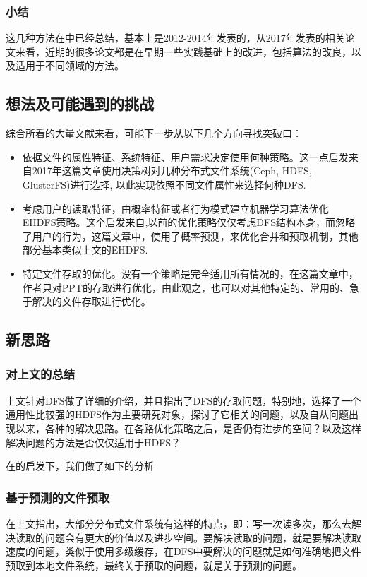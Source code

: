 \documentclass[UTF8]{ctexart}
\begin{document}
\subsubsection{小结}
这几种方法在\cite{Sachin}中已经总结，基本上是2012-2014年发表的，从2017年发表的相关论文来看，近期的很多论文都是在早期一些实践基础上的改进，包括算法的改良，以及适用于不同领域的方法。

\subsection{想法及可能遇到的挑战}
综合所看的大量文献来看，可能下一步从以下几个方向寻找突破口：

\begin{itemize}
\item 依据文件的属性特征、系统特征、用户需求决定使用何种策略。这一点启发来自2017年这篇文章\cite{Lidong}使用决策树对几种分布式文件系统(Ceph, HDFS, GlusterFS)进行选择, 以此实现依照不同文件属性来选择何种DFS. 
\item 考虑用户的读取特征，由概率特征或者行为模式建立机器学习算法优化EHDFS策略。这个启发来自\cite{TaoW},以前的优化策略仅仅考虑DFS结构本身，而忽略了用户的行为，这篇文章中，使用了概率预测，来优化合并和预取机制，其他部分基本类似上文的EHDFS.
\item 特定文件存取的优化。没有一个策略是完全适用所有情况的，在这篇\cite{DongB}文章中，作者只对PPT的存取进行优化，由此观之，也可以对其他特定的、常用的、急于解决的文件存取进行优化。
\end{itemize}

\subsection{新思路}
\subsubsection{对上文的总结}
上文针对DFS做了详细的介绍，并且指出了DFS的存取问题，特别地，选择了一个通用性比较强的HDFS作为主要研究对象，探讨了它相关的问题，以及自从问题出现以来，各种的解决思路。在各路优化策略之后，是否仍有进步的空间？以及这样解决问题的方法是否仅仅适用于HDFS？

在\cite{Milad}的启发下，我们做了如下的分析

\subsubsection{基于预测的文件预取}
在上文指出，大部分分布式文件系统有这样的特点，即：写一次读多次，那么去解决读取的问题会有更大的价值以及进步空间。要解决读取的问题，就是要解决读取速度的问题，类似于使用多级缓存，在DFS中要解决的问题就是如何准确地把文件预取到本地文件系统，最终关于预取的问题，就是关于预测的问题。
\end{document}
